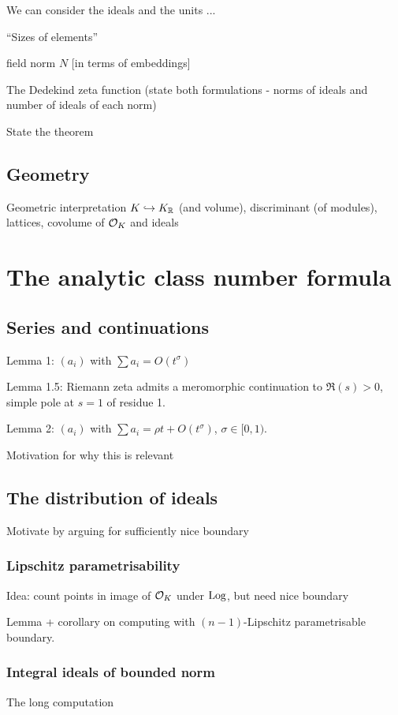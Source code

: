 \documentclass[11pt]{report}
\begin{document}
We can consider the ideals and the units ...

``Sizes of elements''




field norm $N$ [in terms of embeddings]



The Dedekind zeta function (state both formulations - norms of ideals and number of ideals of each norm)

State the theorem

\section{Geometry}
Geometric interpretation $K \hookrightarrow K_{\mathbb{R}}$ (and volume), discriminant (of modules), lattices, covolume of $\mathcal{O}_K$ and ideals

\chapter{The analytic class number formula}
\section{Series and continuations} %
Lemma 1: $(a_i)$ with $\sum a_i = O(t^\sigma)$

Lemma 1.5: Riemann zeta admits a meromorphic continuation to $\Re(s) > 0$, simple pole at $s = 1$ of residue 1.

Lemma 2: $(a_i)$ with $\sum a_i = \rho t + O(t^\sigma)$, $\sigma \in [0, 1)$.

Motivation for why this is relevant
\section{The distribution of ideals}
Motivate by arguing for sufficiently nice boundary
\subsection{Lipschitz parametrisability}
Idea: count points in image of $\mathcal{O}_K$ under $\operatorname{Log}$, but need nice boundary

Lemma + corollary on computing with $(n - 1)$-Lipschitz parametrisable boundary.

\subsection{Integral ideals of bounded norm}
The long computation
\end{document}
